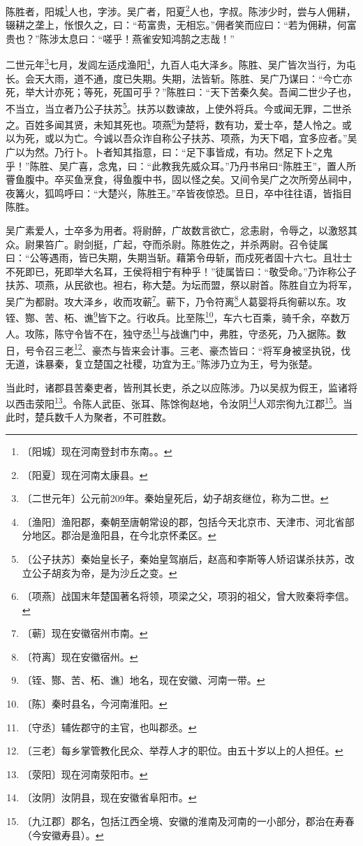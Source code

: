 \documentclass[12pt,UTF-8,openany,a4]{ctexbook}
\begin{document}
\begin{large}
    
    陈胜者，阳城\footnote{〔阳城〕\yiwen 现在河南登封市东南。。}人也，字涉。吴广者，阳夏\footnote{〔阳夏〕\yiwen 现在河南太康县。}人也，字叔。陈涉少时，尝与人佣耕，辍耕之垄上，怅恨久之，曰：“苟富贵，无相忘。”佣者笑而应曰：“若为佣耕，何富贵也？”陈涉太息曰：“嗟乎！燕雀安知鸿鹄之志哉！”
    
    二世元年\footnote{〔二世元年〕\yiwen 公元前209年。秦始皇死后，幼子胡亥继位，称为二世。}七月，发闾左适戍渔阳\footnote{〔渔阳〕\yiwen 渔阳郡，秦朝至唐朝常设的郡，包括今天北京市、天津市、河北省部分地区。郡治是渔阳县，在今北京怀柔区。}，九百人屯大泽乡。陈胜、吴广皆次当行，为屯长。会天大雨，道不通，度已失期。失期，法皆斩。陈胜、吴广乃谋曰：“今亡亦死，举大计亦死；等死，死国可乎？”陈胜曰：“天下苦秦久矣。吾闻二世少子也，不当立，当立者乃公子扶苏\footnote{〔公子扶苏〕\yiwen 秦始皇长子，秦始皇驾崩后，赵高和李斯等人矫诏谋杀扶苏，改立公子胡亥为帝，是为沙丘之变。}。扶苏以数谏故，上使外将兵。今或闻无罪，二世杀之。百姓多闻其贤，未知其死也。项燕\footnote{〔项燕〕\yiwen 战国末年楚国著名将领，项梁之父，项羽的祖父，曾大败秦将李信。}为楚将，数有功，爱士卒，楚人怜之。或以为死，或以为亡。今诚以吾众诈自称公子扶苏、项燕，为天下唱，宜多应者。”吴广以为然。乃行卜。卜者知其指意，曰：“足下事皆成，有功。然足下卜之鬼乎！”陈胜、吴广喜，念鬼，曰：“此教我先威众耳。”乃丹书帛曰“陈胜王”，置人所罾鱼腹中。卒买鱼烹食，得鱼腹中书，固以怪之矣。又间令吴广之次所旁丛祠中，夜篝火，狐鸣呼曰：“大楚兴，陈胜王。”卒皆夜惊恐。旦日，卒中往往语，皆指目陈胜。
    
    吴广素爱人，士卒多为用者。将尉醉，广故数言欲亡，忿恚尉，令辱之，以激怒其众。尉果笞广。尉剑挺，广起，夺而杀尉。陈胜佐之，并杀两尉。召令徒属曰：“公等遇雨，皆已失期，失期当斩。藉第令毋斩，而戍死者固十六七。且壮士不死即已，死即举大名耳，王侯将相宁有种乎！”徒属皆曰：“敬受命。”乃诈称公子扶苏、项燕，从民欲也。袒右，称大楚。为坛而盟，祭以尉首。陈胜自立为将军，吴广为都尉。攻大泽乡，收而攻蕲\footnote{〔蕲〕\yiwen 现在安徽宿州市南。}。蕲下，乃令符离\footnote{〔符离〕\yiwen 现在安徽宿州。}人葛婴将兵徇蕲以东。攻铚、酂、苦、柘、谯\footnote{〔铚、酂、苦、柘、谯〕\yiwen 地名，现在安徽、河南一带。}皆下之。行收兵。比至陈\footnote{〔陈〕\yiwen 秦时县名，今河南淮阳。}，车六七百乘，骑千余，卒数万人。攻陈，陈守令皆不在，独守丞\footnote{〔守丞〕\yiwen 辅佐郡守的主官，也叫郡丞。}与战谯门中，弗胜，守丞死，乃入据陈。数日，号令召三老\footnote{〔三老〕\yiwen 每乡掌管教化民众、举荐人才的职位。由五十岁以上的人担任。}、豪杰与皆来会计事。三老、豪杰皆曰：“将军身被坚执锐，伐无道，诛暴秦，复立楚国之社稷，功宜为王。”陈涉乃立为王，号为张楚。
    
    当此时，诸郡县苦秦吏者，皆刑其长吏，杀之以应陈涉。乃以吴叔为假王，监诸将以西击荥阳\footnote{〔荥阳〕\yiwen 现在河南荥阳市。}。令陈人武臣、张耳、陈馀徇赵地，令汝阴\footnote{〔汝阴〕\yiwen 汝阴县，现在安徽省阜阳市。}人邓宗徇九江郡\footnote{〔九江郡〕\yiwen 郡名，包括江西全境、安徽的淮南及河南的一小部分，郡治在寿春（今安徽寿县）。}。当此时，楚兵数千人为聚者，不可胜数。

\end{large}
\end{document}
